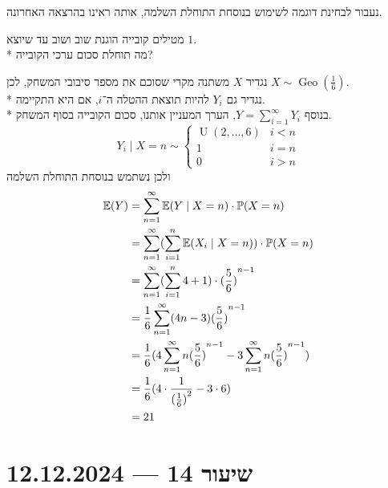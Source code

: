 נעבור לבחינת דוגמה לשימוש בנוסחת התוחלת השלמה, אותה ראינו בהרצאה האחרונה.
\begin{exercise}
	מטילים קובייה הוגנת שוב ושוב עד שיוצא $1$. \\*
	מה תוחלת סכום ערכי הקובייה?
\end{exercise}
\begin{solution}
	נגדיר $X$ משתנה מקרי שסוכם את מספר סיבובי המשחק, לכן $X \sim \operatorname{Geo}(\frac{1}{6})$. \\*
	נגדיר גם $Y_i$ להיות תוצאת ההטלה ה־$i$, אם היא התקיימה. \\*
	בנוסף $Y = \sum_{i = 1}^{\infty} Y_i$, הערך המעניין אותנו, סכום הקובייה בסוף המשחק.
	\[
		Y_i \mid X = n
		\sim \begin{cases}
			\operatorname{U}(2, \dots, 6) & i < n \\
			1 & i = n \\
			0 & i > n
		\end{cases}
	\]
	ולכן נשתמש בנוסחת התוחלת השלמה
	\begin{align*}
		\mathbb{E}(Y)
		& = \sum_{n = 1}^\infty \mathbb{E}(Y \mid X = n) \cdot \mathbb{P}(X = n) \\
		& = \sum_{n = 1}^\infty (\sum_{i = 1}^n \mathbb{E}(X_i \mid X = n)) \cdot \mathbb{P}(X = n) \\
		& = \sum_{n = 1}^\infty (\sum_{i = 1}^n 4 + 1) \cdot {(\frac{5}{6})}^{n - 1} \\
		& = \frac{1}{6} \sum_{n = 1}^\infty (4n - 3) {(\frac{5}{6})}^{n - 1} \\
		& = \frac{1}{6} (4 \sum_{n = 1}^\infty n {(\frac{5}{6})}^{n - 1} - 3 \sum_{n = 1}^\infty n {(\frac{5}{6})}^{n - 1}) \\
		& = \frac{1}{6} (4 \cdot \frac{1}{{(\frac{1}{6})}^2} - 3 \cdot 6) \\
		& = 21
	\end{align*}
\end{solution}

\section{שיעור 14 --- 12.12.2024}
